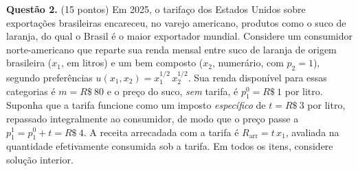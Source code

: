 
\textbf{Questão 2.} (15 pontos) Em 2025, o tarifaço dos Estados Unidos sobre exportações brasileiras encareceu, no varejo americano, produtos como o suco de laranja, do qual o Brasil é o maior exportador mundial. Considere um consumidor norte-americano que reparte sua renda mensal entre suco de laranja de origem brasileira ($x_1$, em litros) e um bem composto ($x_2$, numerário, com $p_2=1$), segundo preferências $u(x_1,x_2)=x_1^{1/2}\,x_2^{1/2}$. Sua renda disponível para essas categorias é $m=R\$~80$ e o preço do suco, \emph{sem} tarifa, é $p_1^{0}=R\$~1$ por litro. Suponha que a tarifa funcione como um imposto \emph{específico} de $t=R\$~3$ por litro, repassado integralmente ao consumidor, de modo que o preço passe a $p_1^{1}=p_1^{0}+t=R\$~4$. A receita arrecadada com a tarifa é $R_{\text{arr}}=t\,x_1$, avaliada na quantidade efetivamente consumida sob a tarifa. Em todos os itens, considere solução interior.

